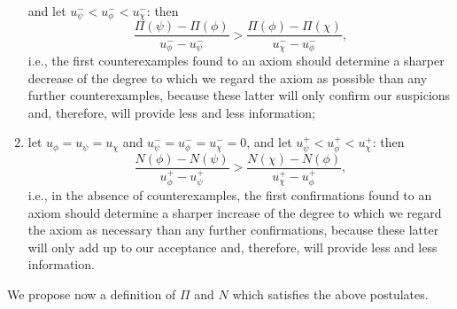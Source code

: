 \documentclass[review]{elsarticle}
\theoremstyle{definition}
\begin{document}
\begin{enumerate}
  and let $u_\psi^- < u_\phi^- < u_\chi^-$: then
  \[
    \frac{\Pi(\psi) - \Pi(\phi)}{u_\phi^- - u_\psi^-} > \frac{\Pi(\phi) - \Pi(\chi)}{u_\chi^- - u_\phi^-},
  \]
  i.e., the first counterexamples found to an axiom should determine a sharper decrease
  of the degree to which we regard the axiom as possible than any further counterexamples,
  because these latter will only confirm our suspicions and, therefore, will provide
  less and less information;
\item\label{decreasing-marginal-nec}
  let $u_\phi = u_\psi = u_\chi$ and $u_\psi^- = u_\phi^- = u_\chi^- = 0$,
  and let $u_\psi^+ < u_\phi^+ < u_\chi^+$: then
  \[
    \frac{N(\phi) - N(\psi)}{u_\phi^+ - u_\psi^+} > \frac{N(\chi) - N(\phi)}{u_\chi^+ - u_\phi^+},
  \]
  i.e., in the absence of counterexamples,
  the first confirmations found to an axiom should determine a sharper increase
  of the degree to which we regard the axiom as necessary than any further confirmations,
  because these latter will only add up to our acceptance and, therefore, will provide
  less and less information.%
\end{enumerate}

We propose now a definition of $\Pi$ and $N$ which satisfies the above postulates.
\end{document}
